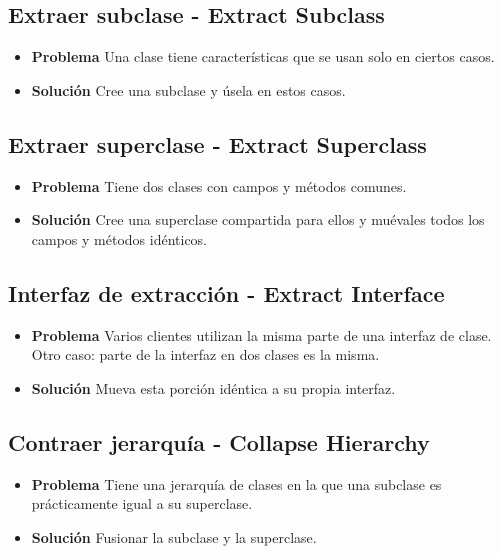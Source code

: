 \documentclass[11pt,a4paper,oneside]{book}
\begin{document}
\subsection{Extraer subclase - Extract Subclass}
\label{renombrarmetodo}
\begin{itemize}
    \item \textbf{Problema} Una clase tiene características que se usan solo en ciertos casos.
    \item \textbf{Solución} Cree una subclase y úsela en estos casos.
\end{itemize}

\subsection{Extraer superclase - Extract Superclass}
\label{renombrarmetodo}
\begin{itemize}
    \item \textbf{Problema} Tiene dos clases con campos y métodos comunes.
    \item \textbf{Solución} Cree una superclase compartida para ellos y muévales todos los campos y métodos idénticos.
\end{itemize}

\subsection{Interfaz de extracción - Extract Interface}
\label{renombrarmetodo}
\begin{itemize}
    \item \textbf{Problema} Varios clientes utilizan la misma parte de una interfaz de clase. Otro caso: parte de la interfaz en dos clases es la misma.
    \item \textbf{Solución} Mueva esta porción idéntica a su propia interfaz.
\end{itemize}

\subsection{Contraer jerarquía - Collapse Hierarchy}
\label{renombrarmetodo}
\begin{itemize}
    \item \textbf{Problema} Tiene una jerarquía de clases en la que una subclase es prácticamente igual a su superclase.
    \item \textbf{Solución} Fusionar la subclase y la superclase.
\end{itemize}
\end{document}
